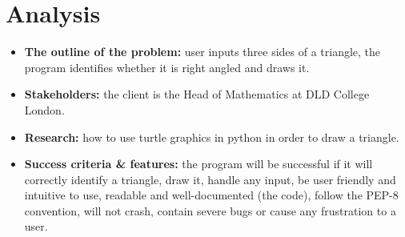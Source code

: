 \documentclass{article}
\begin{document}
\section{Analysis}
\begin{itemize}
    \item \textbf{The outline of the problem:} user inputs three sides of a
        triangle, the program identifies whether it is right angled and draws
        it.
    \item \textbf{Stakeholders:} the client is the Head of Mathematics at DLD
        College London.
    \item \textbf{Research:} how to use turtle graphics in python in order to
        draw a triangle.
    \item \textbf{Success criteria \& features:} the program will be successful
        if it will correctly identify a triangle, draw it, handle any input, be
        user friendly and intuitive to use, readable and well-documented (the
        code), follow the PEP-8 convention,  will not crash, contain severe
        bugs or cause any frustration to a user.
\end{itemize}
\end{document}
